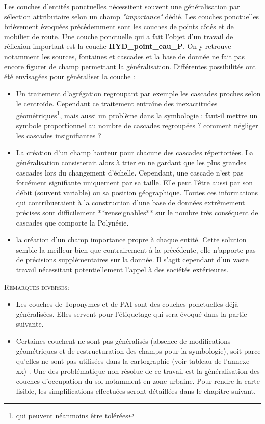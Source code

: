 Les couches d'entités ponctuelles nécessitent souvent une généralisation par sélection attributaire selon un champ \textit{"importance"} dédié. Les couches ponctuelles brièvement évoquées précédemment sont les couches de points côtés et de mobilier de route. Une couche ponctuelle qui a fait l'objet d'un travail de réflexion important est la couche \textbf{HYD\_point\_eau\_P}. On y retrouve notamment les sources, fontaines et cascades et la base de donnée ne fait pas encore figurer de champ permettant la généralisation. Différentes possibilités ont été envisagées pour généraliser la couche :
\begin{itemize}
\item Un traitement d'agrégation regroupant par exemple les cascades proches selon le centroïde. Cependant ce traitement entraîne des inexactitudes géométriques\footnote{qui peuvent néanmoins être tolérées}, mais aussi un problème dans la symbologie : faut-il mettre un symbole proportionnel au nombre de cascades regroupées ? comment négliger les cascades insignifiantes ?
\item La création d'un champ hauteur pour chacune des cascades répertoriées. La généralisation consisterait alors à trier en ne gardant que les plus grandes cascades lors du changement d'échelle. Cependant, une cascade n'est pas forcément signifiante uniquement par sa taille. Elle peut l'être aussi par son débit (souvent variable) ou sa position géographique. Toutes ces informations qui contribueraient à la construction d'une base de données extrêmement précises sont difficilement **renseignables** sur le nombre très conséquent de cascades que comporte la Polynésie.
\item la création d'un champ importance propre à chaque entité. Cette  solution semble la meilleur bien que contrairement à la précédente, elle n'apporte pas de précisions supplémentaires sur la donnée. Il s'agit cependant d'un vaste travail nécessitant potentiellement l'appel à des sociétés extérieures.\\
\end{itemize}

\textsc{Remarques diverses:}
\begin{itemize}
\item Les couches de Toponymes et de PAI sont des couches ponctuelles déjà généralisées. Elles servent pour l'étiquetage qui sera évoqué dans la partie suivante.
\item Certaines couchent ne sont pas généralisés (absence de modifications géométriques et de restructuration des champs pour la symbologie), soit parce qu'elles ne sont pas utilisées dans la cartographie (voir tableau de l'annexe xx) . Une des problématique non résolue de ce travail est la généralisation des couches d'occupation du sol notamment en zone urbaine. Pour rendre la carte lisible, les simplifications effectuées seront détaillées dans le chapitre suivant. 
\end{itemize}





